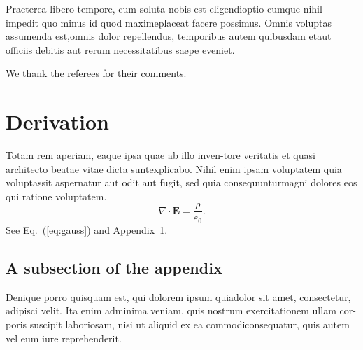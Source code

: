 \documentclass[reprint,aps,pra,superscriptaddress,10pt,nofootinbib,nobalancelastpage,linenumbers]{revtex4-2}
\begin{document}
Praeterea libero tempore, cum soluta nobis est eligendi\linebreak optio cumque nihil impedit quo minus id quod maxime\linebreak placeat facere possimus. Omnis voluptas assumenda est,\linebreak omnis dolor repellendus, temporibus autem quibusdam et\linebreak aut officiis debitis aut rerum necessitatibus saepe eveniet.

\begin{acknowledgments}
We thank the referees for their comments.
\end{acknowledgments}

\appendix
\section{Derivation}\label{app:derivation}
Totam rem aperiam, eaque ipsa quae ab illo inven-\linebreak tore veritatis et quasi architecto beatae vitae dicta sunt\linebreak explicabo. Nihil enim ipsam voluptatem quia voluptas\linebreak sit aspernatur aut odit aut fugit, sed quia consequuntur\linebreak magni dolores eos qui ratione voluptatem.
\begin{equation}
\nabla \cdot \mathbf{E} = \frac{\rho}{\varepsilon_0} .
\label{eq:gauss}
\end{equation}
See Eq.~(\ref{eq:gauss}) and Appendix~\ref{app:derivation}.

\subsection{A subsection of the appendix}
Denique porro quisquam est, qui dolorem ipsum quia\linebreak dolor sit amet, consectetur, adipisci velit. Ita enim ad\linebreak minima veniam, quis nostrum exercitationem ullam cor-\linebreak poris suscipit laboriosam, nisi ut aliquid ex ea commodi\linebreak consequatur, quis autem vel eum iure reprehenderit.
\end{document}
